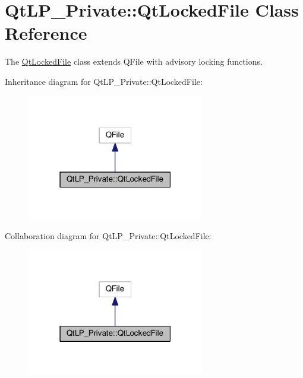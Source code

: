 \hypertarget{class_qt_l_p___private_1_1_qt_locked_file}{}\section{Qt\+L\+P\+\_\+\+Private\+:\+:Qt\+Locked\+File Class Reference}
\label{class_qt_l_p___private_1_1_qt_locked_file}


The \hyperlink{class_qt_l_p___private_1_1_qt_locked_file}{Qt\+Locked\+File} class extends Q\+File with advisory locking functions.  




Inheritance diagram for Qt\+L\+P\+\_\+\+Private\+:\+:Qt\+Locked\+File\+:
\nopagebreak
\begin{figure}[H]
\begin{center}
\leavevmode
\includegraphics[width=219pt]{class_qt_l_p___private_1_1_qt_locked_file__inherit__graph}
\end{center}
\end{figure}


Collaboration diagram for Qt\+L\+P\+\_\+\+Private\+:\+:Qt\+Locked\+File\+:
\nopagebreak
\begin{figure}[H]
\begin{center}
\leavevmode
\includegraphics[width=219pt]{class_qt_l_p___private_1_1_qt_locked_file__coll__graph}
\end{center}
\end{figure}
